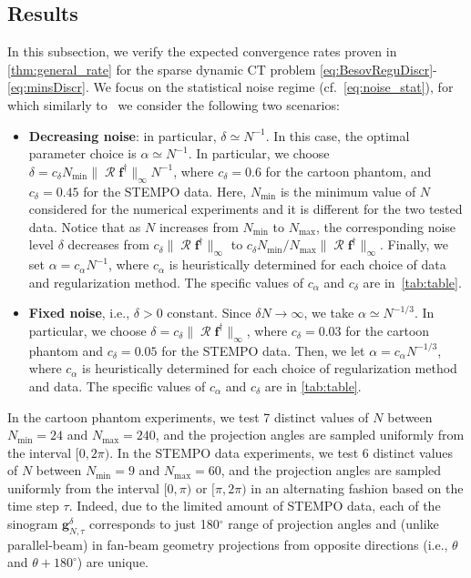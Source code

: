 \documentclass[11pt,a4paper]{article}
\numberwithin{equation}{section}
\DeclareMathOperator{\RadonD}{\vec{\mathcal{R}}}
\renewcommand{\vec}[1]{\boldsymbol{#1}} %
\newcommand{\f}{\vec{f}} %
\newcommand{\g}{\vec{g}} %
\begin{document}
\subsection{Results}\label{ssec:results}
In this subsection, we verify the expected convergence rates proven in \cref{thm:general_rate} for the sparse dynamic CT problem \eqref{eq:BesovReguDiscr}-\eqref{eq:minsDiscr}. We focus on the statistical noise regime (cf.~\eqref{eq:noise_stat}), for which similarly to~\cite{bubba2021,Bubba22}  we consider the following two scenarios:
\begin{itemize}
    \item  {\bf Decreasing noise}: in particular, $\delta \simeq N^{-1}$. In this case, the optimal parameter choice is $\alpha \simeq N^{-1}$. In particular, we choose $\delta = c_{\delta}  N_{\min} \|\RadonD \f^\dag\|_{\infty} N^{-1}$, where $c_{\delta} = 0.6$ for the cartoon phantom, and $c_{\delta} = 0.45$ for the STEMPO data. Here, $N_{\min}$ is the minimum value of $N$ considered for the numerical experiments and it is different for the two tested data. Notice that as $N$ increases from $N_{\min}$ to $N_{\max}$, the corresponding noise level $\delta$ decreases from $c_{\delta} \|\RadonD \f^\dag\|_{\infty}$ to $c_{\delta} N_{\min}/N_{\max} \|\RadonD \f^\dag\|_{\infty}$. Finally, we set $\alpha = c_{\alpha}N^{-1}$, where $c_{\alpha}$ is heuristically determined for each choice of data and regularization method. The specific values of $c_\alpha$ and $c_\delta$ are in~\cref{tab:table}. 
    
    \item {\bf Fixed noise}, i.e., $\delta > 0$ constant. Since $\delta N \rightarrow \infty$, we take $\alpha \simeq N^{-1/3}$. In particular, we choose $\delta = c_{\delta} \|\RadonD \f^\dag\|_{\infty}$, where $c_{\delta} = 0.03$ for the cartoon phantom and $c_{\delta} = 0.05$ for the STEMPO data. 
    Then, we let $\alpha = c_{\alpha}N^{-1/3}$, where $c_{\alpha}$ is heuristically determined for each choice of regularization method and data. The specific values of $c_\alpha$ and $c_\delta$ are in \cref{tab:table}.
\end{itemize}

In the cartoon phantom experiments, we test 7 distinct values of $N$ between $N_{\min} = 24$ and $N_{\max} = 240$, and the projection angles are sampled uniformly from the interval $[0,2\pi)$. 
In the STEMPO data experiments, we test 6 distinct values of $N$ between $N_{\min} = 9$ and $N_{\max} = 60$, and the projection angles are sampled uniformly from the interval $[0,\pi)$ or $[\pi, 2\pi)$ in an alternating fashion based on the time step $\tau$. 
Indeed, due to the limited amount of STEMPO data, each of the sinogram $\g^{\delta}_{N,\tau}$ corresponds to just 180$^\circ$ range of projection angles and (unlike parallel-beam) in fan-beam geometry projections from opposite directions  (i.e., $\theta$ and $\theta + 180^\circ$) are unique.
\end{document}
